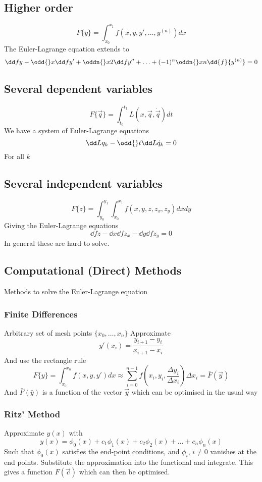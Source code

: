 \documentclass{E:/Documents/Latex/myassignment}
\begin{document}
\subsection{Higher order}
\[F\{y\} = \int_{x_0}^{x_1} f(x,y,y',\ldots,y^{(n)}) dx\]
The Euler-Lagrange equation extends to
\[\dd fy - \odd{}x \dd f{y'} + \oddn{}x2 \dd f{y''} + \ldots + (-1)^{n}\oddn{}xn \dd{f}{y^{(n)}} = 0\]

\subsection{Several dependent variables}
\[F\{\vec q\} = \int_{t_0}^{t_1} L(x,\vec q, \dot{\vec q}) dt\]
We have a system of Euler-Lagrange equations
\[\dd L{q_k} - \odd{}t \dd L{\dot{q}_k} = 0\]
For all $k$ 


\subsection{Several independent variables}
\[F\{z\} = \int_{y_0}^{y_1} \int_{x_0}^{x_1} f(x,y,z,z_x,z_y) dxdy\]
Giving the Euler-Lagrange equations
\[\dd fz - \dd{}x \dd f{z_x} - \dd{}y \dd f{z_y} = 0\]
In general these are hard to solve.


\subsection{Computational (Direct) Methods}
Methods to solve the Euler-Lagrange equation
\subsubsection{Finite Differences}
Arbitrary set of mesh points $\{x_0,\ldots,x_n\}$
Approximate
\[y'(x_i) = \frac{y_{i+1} - y_i}{x_{i+1} - x_i}\]
And use the rectangle rule
\[F\{y\} = \int_{x_0}^{x_n} f(x,y,y') dx \approx \sum_{i=0}^{n-1} f\left(x_i,y_i, \frac{\Delta y_i}{\Delta x_i}\right) \Delta x_i = \bar{F}(\vec y)\]
And $\bar{F}(\bar y)$ is a function of the vector $\vec y$ which can be optimised in the usual way

\subsubsection{Ritz' Method}
Approximate $y(x)$ with
\[y(x) = \phi_0(x) + c_1 \phi_1(x) + c_2\phi_2 (x) + \ldots + c_n\phi_n(x)\]
Such that $\phi_0(x)$ satisfies the end-point conditions, and $\phi_i$, $i\neq 0$ vanishes at the end points. Substitute the approximation into the functional and integrate. This gives a function $F(\vec c)$ which can then be optimised. 
\end{document}
